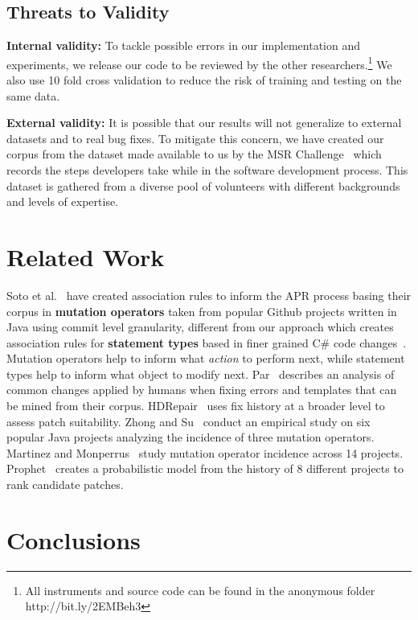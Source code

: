 \documentclass[sigconf]{acmart}
\begin{document}
\subsection{Threats to Validity}
\noindent\textbf{Internal validity:}
To tackle possible errors in our implementation and experiments, we release our code
to be reviewed by the other researchers.\footnote{All instruments
and source code can be found in the anonymous folder 
http://bit.ly/2EMBeh3} 
We also use 10 fold cross validation 
to reduce the risk of training and testing on the same data.  

\noindent\textbf{External validity:} 
It is possible 
that our results will not generalize to external datasets and to
real bug fixes. To mitigate this concern, we have created our corpus 
from the dataset made available to us by the MSR Challenge~\cite{msr18challenge}
which records the steps developers take while in the software development process.
This dataset is gathered from a diverse pool of volunteers with different 
backgrounds and levels of expertise.


\section{ Related Work} 
Soto et al.~\cite{Soto18} have created association rules to inform the APR
process basing their corpus in \textbf{mutation operators} taken from popular Github projects
written in Java using commit level granularity, 
different from our approach which creates association rules for \textbf{statement types} 
based in finer grained C\# code changes~\cite{msr18challenge}. Mutation operators help to 
inform what \textit{action} to perform next, while statement types help to inform what
object to modify next. 
Par~\cite{kim2013} describes an analysis of common changes
applied by humans when fixing errors and templates that can be mined from
their corpus. HDRepair~\cite{xuan16} 
uses fix history at a broader level
to assess patch suitability.
Zhong and Su~\cite{zhong15} conduct an empirical study on six popular Java 
projects analyzing the incidence of three mutation operators. 
Martinez and
Monperrus~\cite{martinez15} study mutation operator incidence across 
14 projects.
Prophet~\cite{long16proph} creates a
probabilistic model from 
the history of 8 different projects to rank candidate
patches.


\section{Conclusions}
\label{conclusions}
\end{document}
